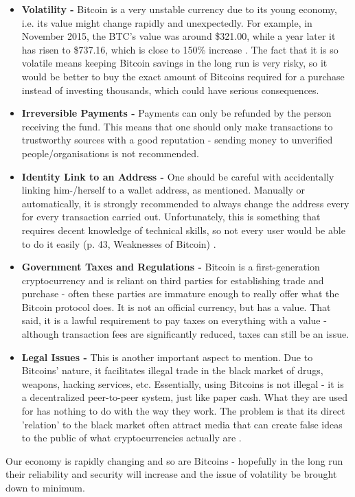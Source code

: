 \documentclass[a4paper, 12pt, titlepage]{article}
\begin{document}
\begin{itemize}
\item{\textbf{Volatility - }}Bitcoin is a very unstable currency due to its young economy, i.e. its value might change rapidly and unexpectedly. For example, in November 2015, the BTC's value was around \$321.00, while a year later it has risen to \$737.16, which is close to 150\% increase \cite{BTCDesk}. The fact that it is so volatile means keeping Bitcoin savings in the long run is very risky, so it would be better to buy the exact amount of Bitcoins required for a purchase instead of investing thousands, which could have serious consequences. 
\item{\textbf{Irreversible Payments - }}Payments can only be refunded by the person receiving the fund. This means that one should only make transactions to trustworthy sources with a good reputation - sending money to unverified people/organisations is not recommended. 
\item{\textbf{Identity Link to an Address - }}One should be careful with accidentally linking him-/herself to a wallet address, as mentioned. Manually or automatically, it is strongly recommended to always change the address every for every transaction carried out. Unfortunately, this is something that requires decent knowledge of technical skills, so not every user would be able to do it easily (p. 43, Weaknesses of Bitcoin) \cite{WhatIsBTC}.
\item{\textbf{Government Taxes and Regulations - }}Bitcoin is a first-generation cryptocurrency and is reliant on third parties for establishing trade and purchase - often these parties are immature enough to really offer what the Bitcoin protocol does. It is not an official currency, but has a value. That said, it is a lawful requirement to pay taxes on everything with a value - although transaction fees are significantly reduced, taxes can still be an issue.
\item{\textbf{Legal Issues - }}This is another important aspect to mention. Due to Bitcoins' nature, it facilitates illegal trade in the black market of drugs, weapons, hacking services, etc. Essentially, using Bitcoins is not illegal - it is a decentralized peer-to-peer system, just like paper cash. What they are used for has nothing to do with the way they work. The problem is that its direct 'relation' to the black market often attract media that can create false ideas to the public of what cryptocurrencies actually are \cite{WhatIsBTC}.
\end{itemize}
Our economy is rapidly changing and so are Bitcoins - hopefully in the long run their reliability and security will increase and the issue of volatility be brought down to minimum.
\end{document}
